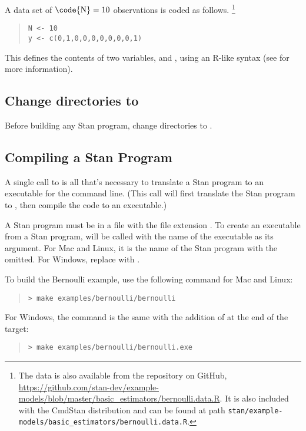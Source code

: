 A data set of $\mbox{\code{N}}=10$ observations is coded as follows.
%
\footnote{
The data is also available from the  repository
on GitHub,
\url{https://github.com/stan-dev/example-models/blob/master/basic_estimators/bernoulli.data.R}.
It is also included with the CmdStan distribution and can be found at path
\nolinkurl{stan/example-models/basic_estimators/bernoulli.data.R}.
}
%
\begin{quote}
\begin{Verbatim}
N <- 10
y <- c(0,1,0,0,0,0,0,0,0,1)
\end{Verbatim}
\end{quote}
%
This defines the contents of two variables,  and ,
using an R-like syntax (see  for more information).

\subsection{Change directories to }

Before building any Stan program, change directories to .

\subsection{Compiling a Stan Program}

A single call to  is all that's necessary to translate a
Stan program to an executable for the command line. (This call will
first translate the Stan program to \Cpp, then compile the \Cpp code
to an executable.)

A Stan program must be in a file with the file extension
. To create an executable from a Stan program,
 will be called with the name of the executable as its
argument. For Mac and Linux, it is the name of the Stan program with
the  omitted. For Windows, replace  with
.

To build the Bernoulli example, use the following command for Mac and
Linux:
%
\begin{quote}
\begin{Verbatim}[fontshape=sl]
> make examples/bernoulli/bernoulli
\end{Verbatim}
\end{quote}
%
For Windows, the command is the same with the addition of 
at the end of the target:
\begin{quote}
\begin{Verbatim}[fontshape=sl]
> make examples/bernoulli/bernoulli.exe
\end{Verbatim}
\end{quote}

